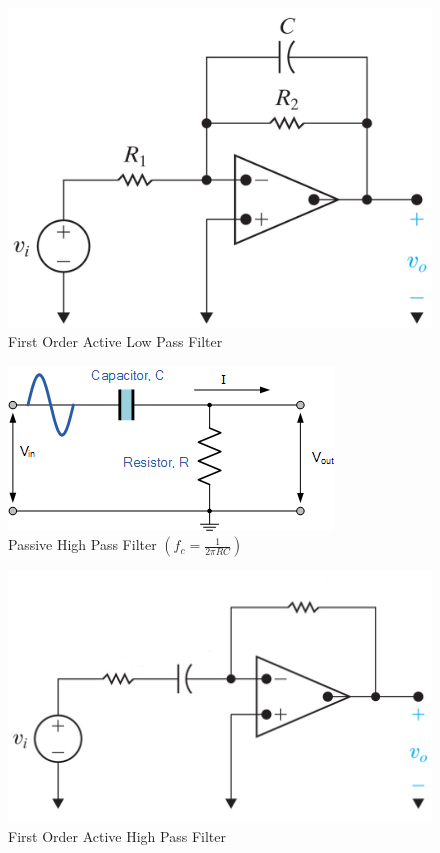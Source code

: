       \begin{figure}[H]
        \centering
        \includegraphics[width=.45\textwidth]{Figures/ALP.png}
        \caption{First Order Active Low Pass Filter}
        \label{fig:5}
      \end{figure}

      \begin{figure}[H]
        \centering
        \includegraphics[width=.45\textwidth]{Figures/PHP.png}
        \caption{Passive High Pass Filter $\left( f_c=\frac{1}{2\pi RC} \right)$}
        \label{fig:6}
      \end{figure}

      \begin{figure}[H]
        \centering
        \includegraphics[width=.45\textwidth]{Figures/AHP.png}
        \caption{First Order Active High Pass Filter}
        \label{fig:7}
      \end{figure}




